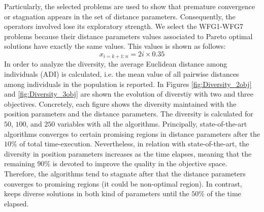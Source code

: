 %
Particularly, the selected problems are used to show that premature convergence or stagnation appears in the set of distance parameters.
%
Consequently, the operators involved lose its exploratory strength.
%
%
%
%
%
%
%
%
We select the WFG1-WFG7 problems because their distance parameters values associated to Pareto optimal solutions have exactly the same values.
%
This values is shown as follows:
\begin{equation}
   x_{i=k+1:n} = 2i \times 0.35
\end{equation}
%
%
%
In order to analyze the diversity, the average Euclidean distance among individuals (ADI) is calculated, i.e. the mean value of all pairwise distances among individuals in the population is reported.
%
In Figures \ref{fig:Diversity_2obj} and \ref{fig:Diversity_3obj} are shown the evolution of diverstiy with two and three objectives.
%
Concretely, each figure shows the diversity maintained with the position parameters and the distance parameters.
%
The diversity is calculated for $50$, $100$, and $250$ variables with all the algorithms.
%
Principally, state-of-the-art algorithms converges to certain promising regions in distance parameters after the $10\%$ of total time-execution.
%
Nevertheless, in relation with state-of-the-art, the diversity in position parameters increases as the time elapses, meaning that the remaining $90\%$ is devoted to improve the quality in the objective space.
%
Therefore, the algorithms tend to stagnate after that the distance parameters converges to promising regions (it could be non-optimal region).
%
In contrast, \VSDMOEA{} keeps diverse solutions in both kind of parameters until the $50\%$ of the time elapsed.
%


